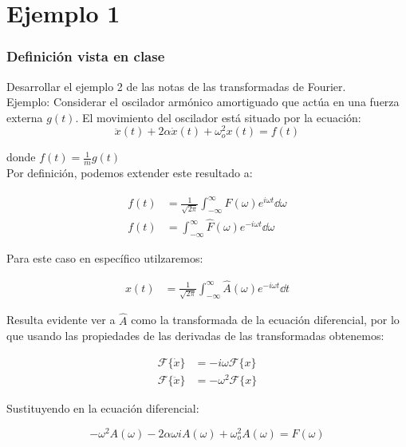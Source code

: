 \documentclass[11pt]{report}
\theoremstyle{plain}
\theoremstyle{definition}
\begin{document}
\part{Ejemplo 1}
\section{Definición vista en clase}

Desarrollar el ejemplo 2 de las notas de las transformadas de Fourier.\\
Ejemplo: Considerar el oscilador armónico amortiguado que actúa en una fuerza externa $g(t)$. El movimiento del oscilador está situado por la ecuación:
\begin{equation*}
	\ddot{x}(t) + 2\alpha \dot x (t) + \omega^2_o x(t) = f(t)
\end{equation*}

donde $f(t) = \frac{1}{m} g(t)$\\

Por definición, podemos extender este resultado a:

\begin{align*}
	f(t) &= \frac{1}{\sqrt{2\pi}}\int_{-\infty}^\infty \hat F(\omega) e^{i\omega t}\dd{\omega}\\
	f(t) &= \int_{-\infty}^\infty \hat F(\omega) e^{-i\omega t} \dd{\omega}
\end{align*}

Para este caso en específico utilzaremos:

\begin{align*}
	x(t) &= \frac{1}{\sqrt{2\pi}}\int_{-\infty}^\infty \hat A(\omega) e^{-i\omega t}\dd{t}
\end{align*}

Resulta evidente ver a $\hat A$ como la transformada de la ecuación diferencial, por lo que usando las propiedades de las derivadas de las transformadas obtenemos:

\begin{align*}
	\mathcal{F}\lbrace \dot{x} \rbrace &= -i\omega \mathcal{F}\lbrace x \rbrace\\
	\mathcal{F}\lbrace \ddot{x} \rbrace &= -\omega^2 \mathcal{F}\lbrace x \rbrace
\end{align*}

Sustituyendo en la ecuación diferencial:

\begin{equation*}
	-\omega^2 A(\omega) -2\alpha\omega iA(\omega)+\omega^2_oA(\omega) = F(\omega)
\end{equation*}
\end{document}

